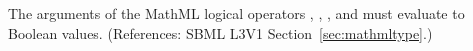 \removedRule
  {The arguments of the MathML logical operators , , , and  must evaluate to Boolean values.}
  {(References: SBML L3V1 Section~\ref{sec:mathmltype}.)}
